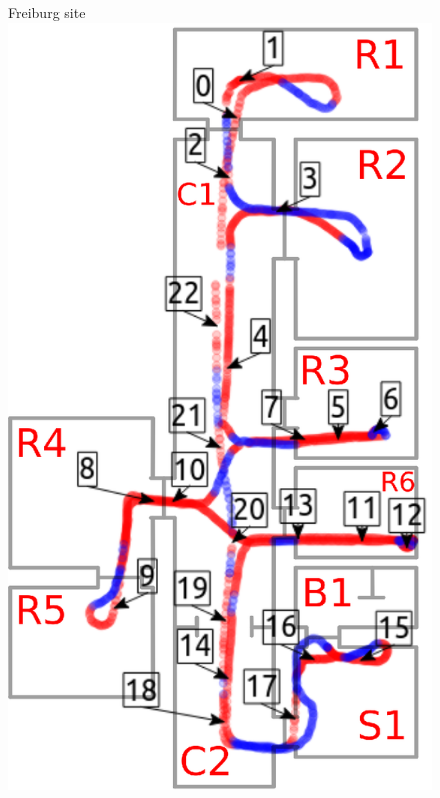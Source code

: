 {\begin{columns}[T]
		\begin{figure}[p]
			\centering Freiburg site
			\hspace{-0cm}
			\includegraphics[width = 1.0\textwidth]{img/icsc/detected_places_fr2_ssg}
			\label{fig:fr_map}
		\end{figure}
		

		
	\end{columns}		

}
